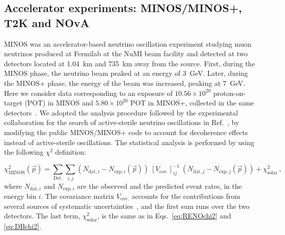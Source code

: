\documentclass[aps, prd, onecolumn, tightenlines, notitlepage, superscriptaddress, nofootinbib, preprintnumbers, floatfix,showkeys,11pt]{revtex4-2}
\begin{document}
\subsection{Accelerator experiments: MINOS/MINOS+, T2K and NOvA}
\label{sec:accels}

MINOS was an accelerator-based neutrino oscillation experiment studying muon neutrinos produced at Fermilab at the NuMI beam facility and detected at two detectors located at 1.04~km and 735~km away from the source. First, during the MINOS phase, the neutrino beam peaked at an energy of 3~GeV. Later, during the MINOS+ phase, the energy of the beam was increased, peaking at 7~GeV. Here we consider data corresponding to an exposure of $10.56\times10^{20}$ proton-on-target (POT) in MINOS and $5.80\times10^{20}$ POT in MINOS+, collected in the same detectors~\cite{Adamson:2017uda}. We adopted the analysis procedure followed by the experimental collaboration for the search of active-sterile neutrino oscillations in Ref.~\cite{Adamson:2017uda}, by modifying the public MINOS/MINOS+ code to account for decoherence effects instead of  active-sterile oscillations. The statistical analysis is performed by using the following $\chi^2$ definition: 

\begin{equation}
    \chi^2_{\mathrm{MINOS}}(\vec{p}) = \sum_{\text{Det.}}\sum_{i,j} (N_{\text{dat},i} - N_{\text{exp},i}(\vec{p}))~[V_{\text{cov.}}]^{-1}_{ij}~(N_{\text{dat},j} - N_{\text{exp},j}(\vec{p})) + \chi^2_{\text{solar}}\,,
\end{equation}
where $N_{\text{dat},i}$ and $N_{\text{exp},i}$ are the observed and the predicted event rates, in the energy bin $i$. The covariance matrix $V_\text{cov.}$ accounts for the contributions from several sources of systematic uncertainties~\cite{Adamson:2017uda}, and the first sum runs over the two detectors. The last term, $\chi^2_{\text{solar}}$, is the same as in Eqs.~\eqref{eq:RENOchi2} and \eqref{eq:DBchi2}.
\end{document}
